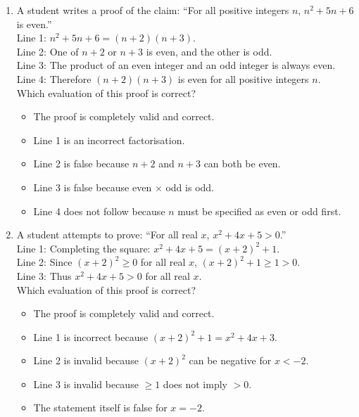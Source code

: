 \documentclass[11pt,a4paper]{article}
\begin{document}
\begin{enumerate}
\item A student writes a proof of the claim: ``For all positive integers $n$, $n^2 + 5n + 6$ is even.''\\
Line 1: $n^2 + 5n + 6 = (n+2)(n+3)$.\\
Line 2: One of $n+2$ or $n+3$ is even, and the other is odd.\\
Line 3: The product of an even integer and an odd integer is always even.\\
Line 4: Therefore $(n+2)(n+3)$ is even for all positive integers $n$.\\
Which evaluation of this proof is correct?
\begin{itemize}
\item[A)] The proof is completely valid and correct.
\item[B)] Line 1 is an incorrect factorisation.
\item[C)] Line 2 is false because $n+2$ and $n+3$ can both be even.
\item[D)] Line 3 is false because even $\times$ odd is odd.
\item[E)] Line 4 does not follow because $n$ must be specified as even or odd first.
\end{itemize}

\item A student attempts to prove: ``For all real $x$, $x^2 + 4x + 5 > 0$.''\\
Line 1: Completing the square: $x^2 + 4x + 5 = (x+2)^2 + 1$.\\
Line 2: Since $(x+2)^2 \ge 0$ for all real $x$, $(x+2)^2 + 1 \ge 1 > 0$.\\
Line 3: Thus $x^2 + 4x + 5 > 0$ for all real $x$.\\
Which evaluation of this proof is correct?
\begin{itemize}
\item[A)] The proof is completely valid and correct.
\item[B)] Line 1 is incorrect because $(x+2)^2 + 1 = x^2 + 4x + 3$.
\item[C)] Line 2 is invalid because $(x+2)^2$ can be negative for $x < -2$.
\item[D)] Line 3 is invalid because $\ge 1$ does not imply $> 0$.
\item[E)] The statement itself is false for $x = -2$.
\end{itemize}


\end{enumerate}
\end{document}
